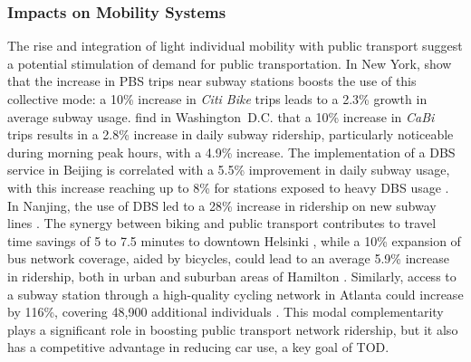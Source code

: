\begin{refsegment}
\subsubsection*{Impacts on Mobility Systems
    \label{chap2:impacts-mobilite}
    }

The rise and integration of light individual mobility with public transport suggest a potential stimulation of demand for public transportation. In New York, \textcolor{blue}{\textcite[932]{ashraf_impacts_2021}} show that the increase in \acrshort{PBS} trips near subway stations boosts the use of this collective mode: a 10\% increase in \textsl{Citi Bike} trips leads to a 2.3\% growth in average subway usage. \textcolor{blue}{\textcite[8]{ma_bicycle_2015}} find in Washington~D.C. that a 10\% increase in \textsl{CaBi} trips results in a 2.8\% increase in daily subway ridership, particularly noticeable during morning peak hours, with a 4.9\% increase. The implementation of a \acrshort{DBS} service in Beijing is correlated with a 5.5\% improvement in daily subway usage, with this increase reaching up to 8\% for stations exposed to heavy \acrshort{DBS} usage \textcolor{blue}{\autocite[8]{fan_dockless_2020}}. In Nanjing, the use of \acrshort{DBS} led to a 28\% increase in ridership on new subway lines \textcolor{blue}{\autocite[11]{yang_spatiotemporal_2019}}. The synergy between biking and public transport contributes to travel time savings of 5 to 7.5 minutes to downtown Helsinki \textcolor{blue}{\autocite[22]{jappinen_modelling_2013}}, while a 10\% expansion of bus network coverage, aided by bicycles, could lead to an average 5.9\% increase in ridership, both in urban and suburban areas of Hamilton \textcolor{blue}{\autocite[11]{zuo_promote_2020}}. Similarly, access to a subway station through a high-quality cycling network in Atlanta could increase by 116\%, covering 48,900 additional individuals \textcolor{blue}{\autocite[59]{bearn_adaption_2018}}. This modal complementarity plays a significant role in boosting public transport network ridership, but it also has a competitive advantage in reducing car use, a key goal of \acrshort{TOD}.%


\end{refsegment}
